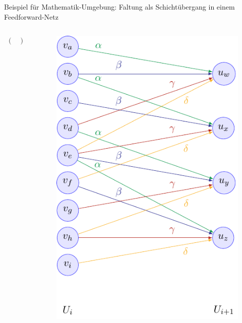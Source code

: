 \documentclass[
  scale = 1.5,
]{hftpostr}
\begin{document}
\begin{frame}[fragile, t]
\begin{block}{Beispiel für Mathematik-Umgebung: Faltung als Schichtübergang in einem Feedforward-Netz}
\begin{columns}[onlytextwidth, T]
\begin{column}{0.42\textwidth}
\begin{align*}
\begin{pmatrix}
    		\end{pmatrix}
    \end{align*}
      \end{column}
      \begin{column}{0.23\textwidth}
        \begin{center}
          \begin{figure}
            \includegraphics[width=.8\textwidth]{exampleFigure.pdf}
          \end{figure}
        \end{center}
      \end{column}
    \end{columns}

  \end{block}



\end{frame}
\end{document}

